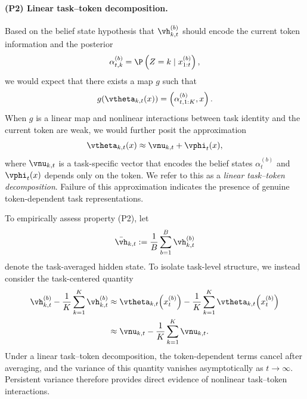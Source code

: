 \paragraph{(P2) Linear task--token decomposition.}
Based on the belief state hypothesis that $\vh_{k,t}^{(b)}$ should encode the current token information and the posterior
$$
\alpha^{(b)}_{t,k} = \P\left(Z = k \mid x^{(b)}_{1:t}\right),
$$
we would expect that there exists a map $g$ such that 
\begin{equation*}
    g(\vtheta_{k,t}(x)) = \left(\alpha^{(b)}_{t,1:K}, x\right). 
\end{equation*}
When $g$ is a linear map and nonlinear interactions between task identity and the current token are weak,
we would further posit the approximation
\[
\vtheta_{k,t}(x) \approx \vnu_{k,t} + \vphi_t(x),
\]
where $\vnu_{k,t}$ is a task-specific vector that encodes the belief states $\alpha^{(b)}_{t}$ and $\vphi_t(x)$ depends only on the token.
We refer to this as a \emph{linear task--token decomposition}.
Failure of this approximation indicates the presence of genuine token-dependent task representations.




To empirically assess property (P2), let
\[
\bar{\vh}_{k,t} := \frac{1}{B}\sum_{b=1}^B \vh^{(b)}_{k,t}
\]
denote the task-averaged hidden state.
To isolate task-level structure, we instead consider the task-centered quantity
\[
\begin{aligned}
\vh^{(b)}_{k,t} - \frac{1}{K}\sum_{k=1}^K \vh^{(b)}_{k,t}
&\approx
\vtheta_{k,t}\!\left(x^{(b)}_t\right)
- \frac{1}{K}\sum_{k=1}^K \vtheta_{k,t}\!\left(x^{(b)}_t\right)\\
&\approx \vnu_{k,t} - \frac{1}{K} \sum_{k=1}^K \vnu_{k,t}. 
\end{aligned}
\]
Under a linear task--token decomposition, the token-dependent terms cancel after averaging,
and the variance of this quantity vanishes asymptotically as $t \to \infty$.
Persistent variance therefore provides direct evidence of nonlinear task--token interactions.